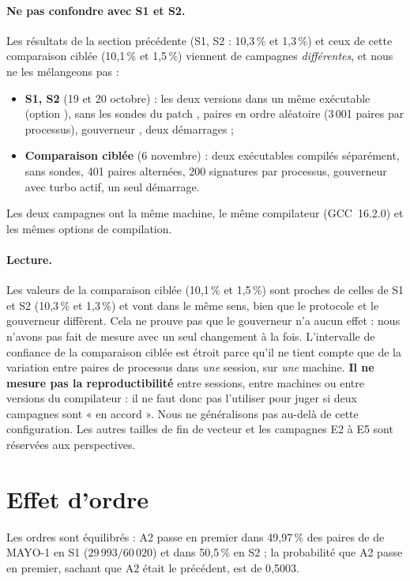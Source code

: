 \paragraph{Ne pas confondre avec S1 et S2.} Les résultats de la section précédente (S1, S2 : 10,3\,\% et 1,3\,\%) et ceux de cette comparaison ciblée (10,1\,\% et 1,5\,\%) viennent de campagnes \emph{différentes}, et nous ne les mélangeons pas :
\begin{itemize}
\item \textbf{S1, S2} (19 et 20 octobre) : les deux versions dans un même exécutable (option ), sans les sondes du patch , paires en ordre aléatoire (3\,001 paires par processus), gouverneur , deux démarrages ;
\item \textbf{Comparaison ciblée} (6 novembre) : deux exécutables compilés séparément, sans sondes, 401 paires alternées, 200 signatures par processus, gouverneur  avec turbo actif, un seul démarrage.
\end{itemize}
Les deux campagnes ont la même machine, le même compilateur (GCC~16.2.0) et les mêmes options de compilation.
\paragraph{Lecture.} \I{} Les valeurs de la comparaison ciblée (10,1\,\% et 1,5\,\%) sont proches de celles de S1 et S2 (10,3\,\% et 1,3\,\%) et vont dans le même sens, bien que le protocole et le gouverneur diffèrent. Cela ne prouve pas que le gouverneur n'a aucun effet : nous n'avons pas fait de mesure avec un seul changement à la fois. L'intervalle de confiance de la comparaison ciblée est étroit parce qu'il ne tient compte que de la variation entre paires de processus dans \emph{une} session, sur \emph{une} machine. \textbf{Il ne mesure pas la reproductibilité} entre sessions, entre machines ou entre versions du compilateur : il ne faut donc pas l'utiliser pour juger si deux campagnes sont « en accord ». Nous ne généralisons pas au-delà de cette configuration. Les autres tailles de fin de vecteur et les campagnes E2 à E5 sont réservées aux perspectives.

\section{Effet d'ordre}\label{sec:ordre}
\F{} Les ordres sont équilibrés : A2 passe en premier dans 49,97\,\% des paires de  de MAYO-1 en S1 ($29\,993/60\,020$) et dans 50,5\,\% en S2 ; la probabilité que A2 passe en premier, sachant que A2 était le précédent, est de 0,5003.

